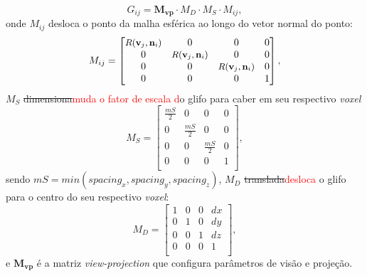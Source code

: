 \begin{equation}
    G_{ij} = \mathbf{M_{vp}}\cdot M_D \cdot M_S \cdot M_{ij},
\end{equation}
onde $M_{ij}$ desloca o ponto da malha esférica ao longo do vetor normal do ponto: 
\begin{equation}
\label{eq::dodf}
    M_{ij} = \begin{bmatrix} 
   \mbox{\small $R( \mathbf{v}_j, \mathbf{n}_i)$} & 0 & 0 & 0 \\
    0 & \mbox{\small $R( \mathbf{v}_j, \mathbf{n}_i)$}  & 0 & 0 \\
    0 & 0 & \mbox{\small $R( \mathbf{v}_j, \mathbf{n}_i)$}  & 0 \\
    0 & 0 & 0 & 1 \\
\end{bmatrix},
\end{equation}
$M_{S}$ \sout{dimensiona}\textcolor{red}{muda o fator de escala d}o glifo para caber em seu respectivo \textit{voxel}
\begin{equation}
    M_{S} = \begin{bmatrix} 
    \frac{mS}{2} & 0             & 0            & 0 \\
    0            & \frac{mS}{2} & 0            & 0 \\
    0            & 0             & \frac{mS}{2} & 0 \\
    0            & 0             & 0            & 1 \\
\end{bmatrix},
\end{equation}
sendo $mS=min(spacing_x , spacing_y , spacing_z)$,
$M_{D}$ \sout{translada}\textcolor{red}{desloca} o glifo para o centro do seu respectivo \textit{voxel}:
\begin{equation}
\label{eq::displace}
    M_{D} = \begin{bmatrix} 
    1 & 0 & 0 & dx \\
    0 & 1 & 0 & dy \\
    0 & 0 & 1 & dz \\
    0 & 0 & 0 & 1 \\
\end{bmatrix},
\end{equation}
e $\mathbf{M_{vp}}$ é a matriz \textit{view-projection} que configura parâmetros de visão e projeção.



